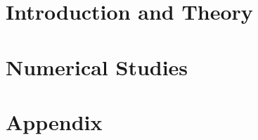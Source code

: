 \documentclass[11pt]{report}
\begin{document}

  \part{Introduction and Theory}
  
  
  
  \part{Numerical Studies}
  
  
  
  

  \part{Appendix}
  \appendix

  
\end{document}
